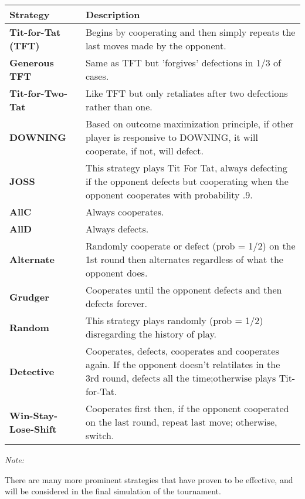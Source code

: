 \documentclass[11pt,preprint, authoryear]{elsarticle}
\let\origtable\table
\let\endorigtable\endtable
\renewenvironment{table}[1][2] {
    \expandafter\origtable\expandafter[H]
} {
    \endorigtable
}
\numberwithin{equation}{section}
\numberwithin{figure}{section}
\numberwithin{table}{section}
\begin{document}
\begin{table}

\caption{\label{tab:unnamed-chunk-1}Some strategies played in past computer tournaments \label{Figure1}}
\centering
\begin{threeparttable}
\begin{tabular}[t]{>{}l>{\raggedright\arraybackslash}p{30em}}
\toprule
Strategy & Description\\
\midrule
\textbf{Tit-for-Tat (TFT)} & Begins by cooperating and then simply repeats the last moves made by the opponent.\\
\textbf{Generous TFT} & Same as TFT but 'forgives' defections in 1/3 of cases.\\
\textbf{Tit-for-Two-Tat} & Like TFT but only retaliates after two defections rather than one.\\
\textbf{DOWNING} & Based on outcome maximization principle, if other player is responsive to DOWNING, it will cooperate, if not, will defect.\\
\textbf{JOSS} & This strategy plays Tit For Tat, always defecting if the opponent defects but cooperating when the opponent cooperates with probability .9.\\
\addlinespace
\textbf{AllC} & Always cooperates.\\
\textbf{AllD} & Always defects.\\
\textbf{Alternate} & Randomly cooperate or defect (prob = 1/2) on the 1st round then alternates regardless of what the opponent does.\\
\textbf{Grudger} & Cooperates until the opponent defects and then defects forever.\\
\textbf{Random} & This strategy plays randomly (prob = 1/2) disregarding the history of play.\\
\addlinespace
\textbf{Detective} & Cooperates, defects, cooperates and cooperates again. If the opponent doesn't relatilates in the 3rd round, defects all the time;otherwise plays Tit-for-Tat.\\
\textbf{Win-Stay-Lose-Shift} & Cooperates first then, if the opponent cooperated on the last round, repeat last move; otherwise, switch.\\
\bottomrule
\end{tabular}
\begin{tablenotes}
\item \textit{Note: } 
\item There are many more prominent strategies that have proven to be effective, and will be considered in the final simulation of the tournament.
\end{tablenotes}
\end{threeparttable}
\end{table}
\end{document}
